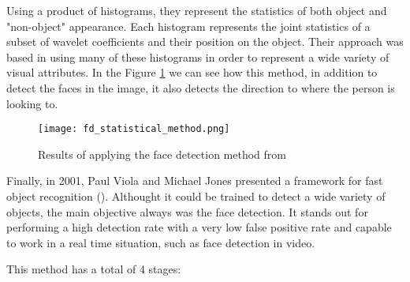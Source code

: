 	Using a product of histograms, they represent the statistics of both object and "non-object" appearance. Each histogram represents the joint statistics of a subset of wavelet coefficients and their position on the object. Their approach was based in using many of these histograms in order to represent a wide variety of visual attributes. In the Figure \ref{fig:statistical_method_face_det} we can see how this method, in addition to detect the faces in the image, it also detects the direction to where the person is looking to.

	\begin{figure}[h!b]
		\centering
		\texttt{[image: fd\_statistical\_method.png]}
		\caption{Results of applying the face detection method from \cite{schneiderman2000statistical}}
		\label{fig:statistical_method_face_det}
	\end{figure}

	Finally, in 2001, Paul Viola and Michael Jones presented a framework for fast object recognition (\cite{viola2001rapid}). Althought it could be trained to detect a wide variety of objects, the main objective always was the face detection. It stands out for performing a high detection rate with a very low false positive rate and capable to work in a real time situation, such as face detection in video.

	This method has a total of 4 stages:
	
